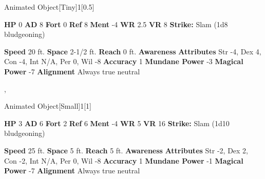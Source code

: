       

      
  \begin{monsubsection}{Animated Object}[Tiny]{1}[0.5]
    \vspace{-1em}\vspace{-1em}
    \vspace{0em}

    
    

    \begin{spellcontent}
      \begin{spelltargetinginfo}
        \pari \textbf{HP} 0 \monsep
          \textbf{AD} 8 \monsep
          \textbf{Fort} 0 \monsep
          \textbf{Ref} 8 \monsep
          \textbf{Ment} -4
        \pari \textbf{WR} 2.5 \monsep
        \textbf{VR} 8
        \pari \textbf{Strike:}
            Slam  (1d8 bludgeoning)
      \end{spelltargetinginfo}
    \end{spellcontent}
    \begin{monsterfooter}
      \pari \textbf{Speed} 20 ft. \monsep
        \textbf{Space} 2-1/2 ft. \monsep
        \textbf{Reach} 0 ft.
      \pari \textbf{Awareness} 
      \pari \textbf{Attributes}
        Str -4, Dex 4,
        Con -4, Int N/A,
        Per 0, Wil -8
      \pari \textbf{Accuracy} 1 \monsep
        \textbf{Mundane Power} -3 \monsep
      \textbf{Magical Power} -7
      \pari \textbf{Alignment} Always true neutral
    \end{monsterfooter}
  \end{monsubsection}
  
  ,
  \begin{monsubsection}{Animated Object}[Small]{1}[1]
    \vspace{-1em}\vspace{-1em}
    \vspace{0em}

    
    

    \begin{spellcontent}
      \begin{spelltargetinginfo}
        \pari \textbf{HP} 3 \monsep
          \textbf{AD} 6 \monsep
          \textbf{Fort} 2 \monsep
          \textbf{Ref} 6 \monsep
          \textbf{Ment} -4
        \pari \textbf{WR} 5 \monsep
        \textbf{VR} 16
        \pari \textbf{Strike:}
            Slam  (1d10 bludgeoning)
      \end{spelltargetinginfo}
    \end{spellcontent}
    \begin{monsterfooter}
      \pari \textbf{Speed} 25 ft. \monsep
        \textbf{Space} 5 ft. \monsep
        \textbf{Reach} 5 ft.
      \pari \textbf{Awareness} 
      \pari \textbf{Attributes}
        Str -2, Dex 2,
        Con -2, Int N/A,
        Per 0, Wil -8
      \pari \textbf{Accuracy} 1 \monsep
        \textbf{Mundane Power} -1 \monsep
      \textbf{Magical Power} -7
      \pari \textbf{Alignment} Always true neutral
    \end{monsterfooter}
  \end{monsubsection}
  

